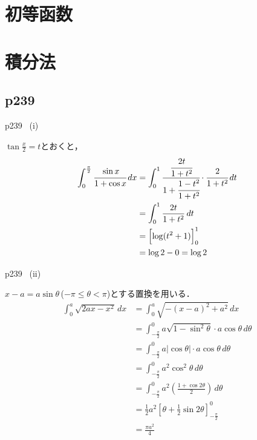 \documentclass[dvipdfmx,uplatex,11pt]{jsarticle}
\theoremstyle{definition}
\begin{document}
\newpage

\section{初等函数}

\newpage

\section{積分法}


\subsection{p239}

\begin{screen}
	p239 \, (i) \par 
	 $\tan \frac{x}{2}=t$とおくと，
	\begin{align*}
		\int_{0}^{\frac{\pi}{2}} \cfrac{\sin x}{1+\cos x} \, dx & = \int_{0}^{1} \cfrac{\cfrac{2t}{1+t^2}}{1+\cfrac{1-t^2}{1+t^2}} \cdot \cfrac{2}{1+t^2} \, dt \\
		& = \int_{0}^{1} \frac{2t}{1+t^2} \, dt \\
		& = \Bigl[\log (t^2+1)\Bigl]_{0}^{1} \\
		& = \log 2-0 = \log 2
	\end{align*}
\end{screen}

\begin{screen}
	p239 \, (ii) \par
	  $x-a=a \sin \theta$\,($ -\pi \le \theta < \pi$)とする置換を用いる．
	\begin{align*}
		\int_{0}^{a} \sqrt{2ax-x^2} \, dx & = \int_{0}^{a} \sqrt{-(x-a)^2+a^2} \, dx \\
		& = \int_{-\frac{\pi}{2}}^{0} a \sqrt{1-\sin ^2 \theta } \cdot a\cos \theta \, d \theta \\
		& = \int_{-\frac{\pi}{2}}^{0} a |\cos \theta| \cdot a\cos \theta \, d \theta \\
		& = \int_{-\frac{\pi}{2}}^{0} a^2 \cos^2 \theta \, d \theta \\
		& = \int_{-\frac{\pi}{2}}^{0} a^2 \left (\frac{1+\cos 2 \theta }{2}\right) \, d \theta \\
		& = \frac{1}{2} a^2 \left [\theta + \frac{1}{2}\sin 2 \theta \right ]_{-\frac{\pi}{2}}^{0} \\
		&= \frac{\pi a^2}{4}
	\end{align*}
\end{screen}
\end{document}
